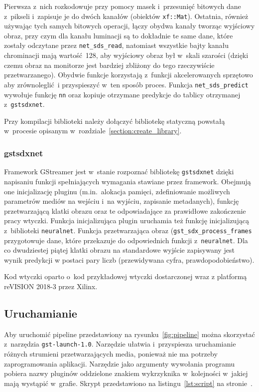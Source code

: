 \documentclass[12pt, oneside, a4paper]{article}
\begin{document}
Pierwsza z~nich rozkodowuje przy pomocy masek i~przesunięć bitowych
dane z~pikseli i~zapisuje je do dwóch kanałów (obiektów \lstinline{xf::Mat}).
Ostatnia, również używając tych samych bitowych operacji, łączy obydwa kanały
tworząc wyjściowy obraz, przy czym dla kanału luminacji są to dokładnie te
same dane, które zostały odczytane przez \lstinline{net_sds_read},
natomiast wszystkie bajty kanału chrominacji mają wartość 128,
aby wyjściowy obraz był w~skali szarości (dzięki czemu
obraz na monitorze jest bardziej zbliżony do tego rzeczywiście przetwarzanego).
Obydwie funkcje korzystają z~funkcji akcelerowanych
sprzętowo aby zrównoleglić i przyspieszyć w~ten sposób proces.
Funkcja \lstinline{net_sds_predict} wywołuje funkcję \lstinline{nn} oraz
kopiuje otrzymane predykcje do tablicy otrzymanej z~\lstinline{gstsdxnet}.

Przy kompilacji biblioteki należy dołączyć bibliotekę statyczną
powstałą w~procesie opisanym w~rozdziale~\ref{section:create_library}.

\subsubsection{gstsdxnet}\label{sec:gstsdxnet}
Framework GStreamer jest w~stanie rozpoznać bibliotekę \lstinline{gstsdxnet}
dzięki napisaniu funkcji spełniających wymagania stawiane przez framework.
Obejmują one inicjalizację pluginu (m.in.~alokacja pamięci, zdefiniowanie
możliwych parametrów mediów na wejściu i~na wyjściu, zapisanie
metadanych), funkcję
przetwarzającą klatki obrazu oraz te odpowiadające za prawidłowe zakończenie
pracy wtyczki. Funkcja inicjalizująca plugin uruchamia też funkcję
inicjalizującą z~biblioteki \lstinline{neuralnet}.
Funkcja przetwarzająca obraz (\lstinline{gst_sdx_process_frames}
przygotowuje dane, które przekazuje do
odpowiednich funkcji z~\lstinline{neuralnet}. Dla co dwudziestej piątej
klatki obrazu na standardowe wyjście zapisywany jest wynik predykcji
w postaci pary liczb (przewidywana cyfra, prawdopodobieństwo). 

Kod wtyczki oparto o~kod przykładowej wtyczki dostarczonej wraz
z platformą reVISION \mbox{2018-3} przez Xilinx.



\newpage
\subsection{Uruchamianie}\label{sec:Uruchamianie}
Aby uruchomić pipeline przedstawiony na rysunku~\ref{fig:pipeline}
można skorzystać z~narzędzia \lstinline{gst-launch-1.0}.
Narzędzie ułatwia i~przyspiesza uruchamianie różnych strumieni
przetwarzających media, ponieważ nie ma potrzeby zaprogramowania
aplikacji. Narzędzie jako argumenty wywołania programu pobiera
nazwy pluginów oddzielone znakiem wykrzyknika
w~kolejności w~jakiej mają wystąpić w~grafie. Skrypt przedstawiono
na listingu~\ref{lst:script} na stronie~\pageref{lst:script}.
\end{document}
